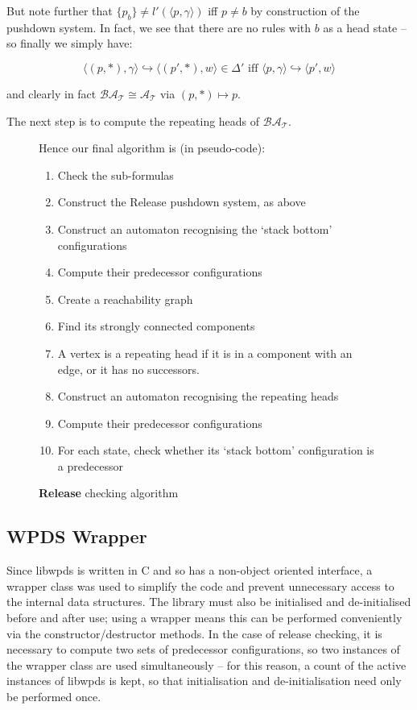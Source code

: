 \documentclass[11pt]{article}
\theoremstyle{definition}
\begin{document}
But note further that $ \{ p_b \} \neq l'(\langle p, \gamma \rangle) $ iff $ p
\neq b $ by construction of the pushdown system. In fact, we see that there are no rules with $b$ as a head state -- so finally we simply have:

\[ \langle (p, *), \gamma \rangle \hookrightarrow \langle (p', *), w\rangle \in \Delta' 
\text{ iff } \langle p, \gamma \rangle \hookrightarrow \langle p', w \rangle \]

and clearly in fact $\mathcal{BA_T} \cong \mathcal{A_T}$ via $(p, *) \mapsto p$.

The next step is to compute the repeating heads of $\mathcal{BA_T}$.





\begin{figure}[h!] %
\caption{\textbf{Release} checking algorithm}
Hence our final algorithm is (in pseudo-code):
\begin{enumerate}
\item{Check the sub-formulas}
\item{Construct the Release pushdown system, as above}
\item{Construct an automaton recognising the `stack bottom' configurations}
\item{Compute their predecessor configurations}
\item{Create a reachability graph}
\item{Find its strongly connected components}
\item{A vertex is a repeating head if it is in a component with an edge, or it has no successors.}
\item{Construct an automaton recognising the repeating heads}
\item{Compute their predecessor configurations}
\item{For each state, check whether its `stack bottom' configuration is a predecessor}
\end{enumerate}
\end{figure}

\subsection{WPDS Wrapper}

Since libwpds is written in C and so has a non-object oriented interface, a
wrapper class was used to simplify the code and prevent unnecessary access to
the internal data structures. The library must also be initialised and
de-initialised before and after use; using a wrapper means this can be
performed conveniently via the constructor/destructor methods. In the case of
release checking, it is necessary to compute two sets of predecessor
configurations, so two instances of the wrapper class are used simultaneously
-- for this reason, a count of the active instances of libwpds is kept, so that
initialisation and de-initialisation need only be performed once.
\end{document}
